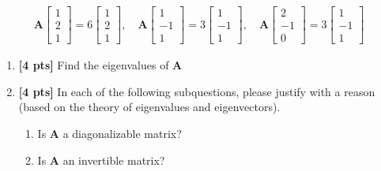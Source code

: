 \documentclass[11pt,addpoints,answers]{exam}
\numberwithin{equation}{section} %
\numberwithin{figure}{section} %
\numberwithin{table}{section} %
\begin{document}
\begin{questions}
    \begin{align*}
    \mathbf{A} \begin{bmatrix}
        1 \\2 \\1
    \end{bmatrix} = 6\begin{bmatrix}
        1 \\ 2 \\1
    \end{bmatrix}, \quad \mathbf{A}\begin{bmatrix}
        1 \\ -1 \\ 1
    \end{bmatrix} = 3 \begin{bmatrix}
        1 \\ -1 \\ 1
    \end{bmatrix}, \quad \mathbf{A} \begin{bmatrix}
        2 \\ -1 \\ 0
    \end{bmatrix} = 3 \begin{bmatrix}
        1 \\ -1 \\ 1
    \end{bmatrix}
    \end{align*}
    \begin{enumerate}[label=\Roman*]
        \item \textbf{[4 pts]} Find the eigenvalues of $\mathbf{A}$
        \item \textbf{[4 pts]} In each of the following subquestions, please justify with a reason (based on the theory of eigenvalues and eigenvectors).
        \begin{enumerate}
            \item Is $\mathbf{A}$ a diagonalizable matrix?
            \item Is $\mathbf{A}$ an invertible matrix?
        \end{enumerate}

    \end{enumerate}
    \begin{tcolorbox}[fit,height=7cm, width=\textwidth, blank, borderline={0.5pt}{-2pt},halign=center, valign=center, nobeforeafter]
    \end{tcolorbox}     
    
\end{questions}
\end{document}
